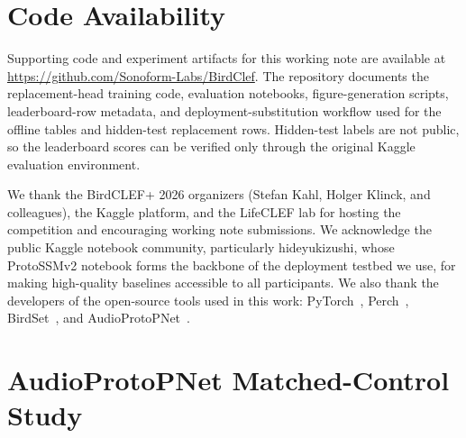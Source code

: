 \documentclass{ceurart}
\begin{document}
\section*{Code Availability}

Supporting code and experiment artifacts for this working note are available at \url{https://github.com/Sonoform-Labs/BirdClef}. The repository documents the replacement-head training code, evaluation notebooks, figure-generation scripts, leaderboard-row metadata, and deployment-substitution workflow used for the offline tables and hidden-test replacement rows. Hidden-test labels are not public, so the leaderboard scores can be verified only through the original Kaggle evaluation environment.

\begin{acknowledgments}
We thank the BirdCLEF+ 2026 organizers (Stefan Kahl, Holger Klinck, and colleagues), the Kaggle platform, and the LifeCLEF lab for hosting the competition and encouraging working note submissions.
We acknowledge the public Kaggle notebook community, particularly hideyukizushi, whose ProtoSSMv2 notebook forms the backbone of the deployment testbed we use, for making high-quality baselines accessible to all participants.
We also thank the developers of the open-source tools used in this work: PyTorch~\cite{paszke2019pytorch}, Perch~\cite{ghani2023global}, BirdSet~\cite{rauch2024birdset}, and AudioProtoPNet~\cite{heinrich2025audioprotopnet}.
\end{acknowledgments}





\appendix

\section{AudioProtoPNet Matched-Control Study}
\label{app:partone}
\end{document}
